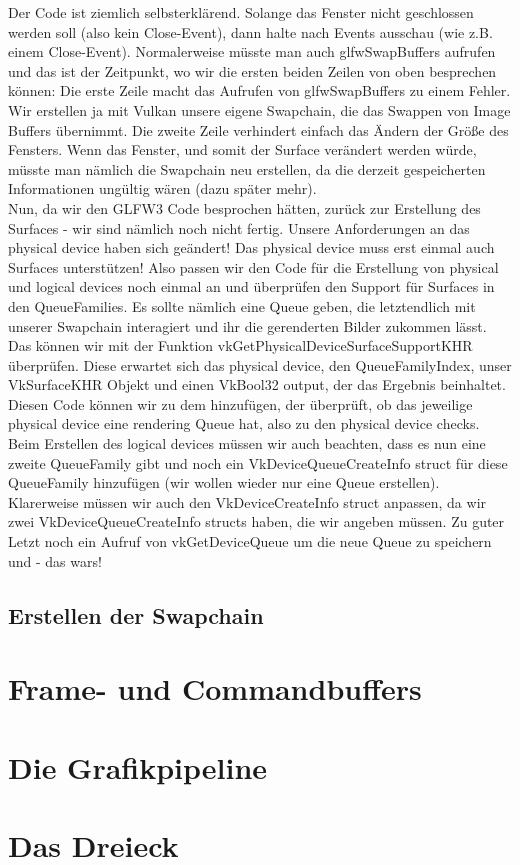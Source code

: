 \documentclass[11pt,a4paper]{report}
\begin{document}
Der Code ist ziemlich selbsterklärend. Solange das Fenster nicht geschlossen werden soll (also kein Close-Event), dann halte nach Events ausschau (wie z.B. einem Close-Event). Normalerweise müsste man auch glfwSwapBuffers aufrufen und das ist der Zeitpunkt, wo wir die ersten beiden Zeilen von oben besprechen können: Die erste Zeile macht das Aufrufen von glfwSwapBuffers zu einem Fehler. Wir erstellen ja mit Vulkan unsere eigene Swapchain, die das Swappen von Image Buffers übernimmt. Die zweite Zeile verhindert einfach das Ändern der Größe des Fensters. Wenn das Fenster, und somit der Surface verändert werden würde, müsste man nämlich die Swapchain neu erstellen, da die derzeit gespeicherten Informationen ungültig wären (dazu später mehr).\\
Nun, da wir den GLFW3 Code besprochen hätten, zurück zur Erstellung des Surfaces - wir sind nämlich noch nicht fertig. Unsere Anforderungen an das physical device haben sich geändert! Das physical device muss erst einmal auch Surfaces unterstützen! Also passen wir den Code für die Erstellung von physical und logical devices noch einmal an und überprüfen den Support für Surfaces in den QueueFamilies. Es sollte nämlich eine Queue geben, die letztendlich mit unserer Swapchain interagiert und ihr die gerenderten Bilder zukommen lässt. Das können wir mit der Funktion vkGetPhysicalDeviceSurfaceSupportKHR überprüfen. Diese erwartet sich das physical device, den QueueFamilyIndex, unser VkSurfaceKHR Objekt und einen VkBool32 output, der das Ergebnis beinhaltet.\\
Diesen Code können wir zu dem hinzufügen, der überprüft, ob das jeweilige physical device eine rendering Queue hat, also zu den physical device checks. Beim Erstellen des logical devices müssen wir auch beachten, dass es nun eine zweite QueueFamily gibt und noch ein VkDeviceQueueCreateInfo struct für diese QueueFamily hinzufügen (wir wollen wieder nur eine Queue erstellen). Klarerweise müssen wir auch den VkDeviceCreateInfo struct anpassen, da wir zwei VkDeviceQueueCreateInfo structs haben, die wir angeben müssen. Zu guter Letzt noch ein Aufruf von vkGetDeviceQueue um die neue Queue zu speichern und - das wars!

\newpage
\section{Erstellen der Swapchain}


\chapter{Frame- und Commandbuffers}
\chapter{Die Grafikpipeline}
\chapter{Das Dreieck}
\end{document}
